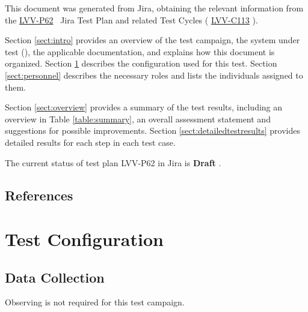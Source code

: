 \documentclass[DM,lsstdraft,STR,toc]{lsstdoc}
\begin{document}
This document was generated from Jira, obtaining the relevant information from the 
\href{https://jira.lsstcorp.org/secure/Tests.jspa#/testPlan/LVV-P62}{LVV-P62}
~Jira Test Plan and related Test Cycles (
  \href{https://jira.lsstcorp.org/secure/Tests.jspa#/testCycle/LVV-C113}{LVV-C113}
).

Section \ref{sect:intro} provides an overview of the test campaign, the system under test (\product{}), the applicable documentation, and explains how this document is organized.
Section \ref{sect:configuration}  describes the configuration used for this test.
Section \ref{sect:personnel} describes the necessary roles and lists the individuals assigned to them.

Section \ref{sect:overview} provides a summary of the test results, including an overview in Table \ref{table:summary}, an overall assessment statement and suggestions for possible improvements.
Section \ref{sect:detailedtestresults} provides detailed results for each step in each test case.

The current status of test plan LVV-P62 in Jira is \textbf{ Draft }.

\subsection{References}
\label{sect:references}
\renewcommand{\refname}{}

\section{Test Configuration}
\label{sect:configuration}

\subsection{Data Collection}

  Observing is not required for this test campaign.
\end{document}
